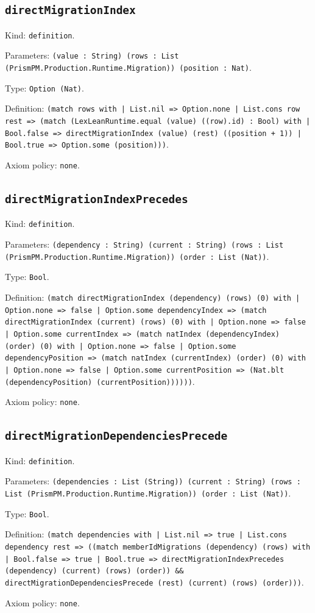 \documentclass[11pt]{article}
\begin{document}
\subsection*{\texttt{directMigrationIndex}}
\noindent Kind: \texttt{definition}.\par
\noindent Parameters: \texttt{(value : String) (rows : List (PrismPM.Production.Runtime.Migration)) (position : Nat)}.\par
\noindent Type: \texttt{Option (Nat)}.\par
\noindent Definition: \texttt{(match rows with | List.nil => Option.none | List.cons row rest => (match (LexLeanRuntime.equal (value) ((row).id) : Bool) with | Bool.false => directMigrationIndex (value) (rest) ((position + 1)) | Bool.true => Option.some (position)))}.\par
\noindent Axiom policy: \texttt{none}.\par
\subsection*{\texttt{directMigrationIndexPrecedes}}
\noindent Kind: \texttt{definition}.\par
\noindent Parameters: \texttt{(dependency : String) (current : String) (rows : List (PrismPM.Production.Runtime.Migration)) (order : List (Nat))}.\par
\noindent Type: \texttt{Bool}.\par
\noindent Definition: \texttt{(match directMigrationIndex (dependency) (rows) (0) with | Option.none => false | Option.some dependencyIndex => (match directMigrationIndex (current) (rows) (0) with | Option.none => false | Option.some currentIndex => (match natIndex (dependencyIndex) (order) (0) with | Option.none => false | Option.some dependencyPosition => (match natIndex (currentIndex) (order) (0) with | Option.none => false | Option.some currentPosition => (Nat.blt (dependencyPosition) (currentPosition))))))}.\par
\noindent Axiom policy: \texttt{none}.\par
\subsection*{\texttt{directMigrationDependenciesPrecede}}
\noindent Kind: \texttt{definition}.\par
\noindent Parameters: \texttt{(dependencies : List (String)) (current : String) (rows : List (PrismPM.Production.Runtime.Migration)) (order : List (Nat))}.\par
\noindent Type: \texttt{Bool}.\par
\noindent Definition: \texttt{(match dependencies with | List.nil => true | List.cons dependency rest => ((match memberIdMigrations (dependency) (rows) with | Bool.false => true | Bool.true => directMigrationIndexPrecedes (dependency) (current) (rows) (order)) \&\& directMigrationDependenciesPrecede (rest) (current) (rows) (order)))}.\par
\noindent Axiom policy: \texttt{none}.\par
\end{document}
